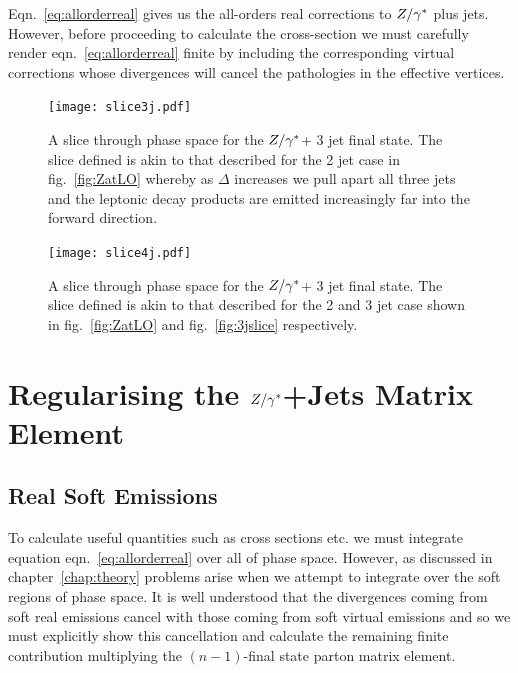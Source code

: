 		Eqn.~\eqref{eq:allorderreal} gives us the all-orders real corrections to $Z/\gamma^*$ plus jets.
		However, before proceeding to calculate the cross-section we must carefully render eqn.~\eqref{eq:allorderreal}
		finite by including the corresponding virtual corrections whose divergences will cancel the pathologies
		in the effective vertices.

		\begin{figure}[hbt]
		  \begin{center}
		    \texttt{[image: slice3j.pdf]}
		    \caption{A slice through phase space for the $Z/\gamma^*$+ 3 jet final state.  The slice defined is
		    akin to that described for the 2 jet case in fig.~\eqref{fig:ZatLO} whereby as $\Delta$ increases
		    we pull apart all three jets and the leptonic decay products are emitted increasingly far into
		    the forward direction.}
		    \label{fig:3jslice}
		  \end{center}
		\end{figure}

		\begin{figure}[hbt]
		  \begin{center}
		    \texttt{[image: slice4j.pdf]}
		    \caption{A slice through phase space for the $Z/\gamma^*$+ 3 jet final state.  The slice defined is
		    akin to that described for the 2 and 3 jet case shown in fig.~\eqref{fig:ZatLO} and
		    fig.~\eqref{fig:3jslice} respectively.}
		    \label{fig:4jslice}
		  \end{center}
		\end{figure}

\section{Regularising the $Z/\gamma^*$+Jets Matrix Element}
	\label{sec:regularising}

	\subsection{Real Soft Emissions}
		\label{sub:softEmissions}

		To calculate useful quantities such as cross sections etc. we must integrate equation
		eqn.~\eqref{eq:allorderreal} over all of phase space.  However, as discussed in chapter~\ref{chap:theory}
		problems arise when we attempt to integrate over the soft regions of phase space.  It is well understood
		that the divergences coming from soft real emissions cancel with those coming from soft
		virtual emissions and so we must explicitly show this cancellation and calculate the remaining
		finite contribution multiplying the $(n-1)$-final state parton matrix element.


